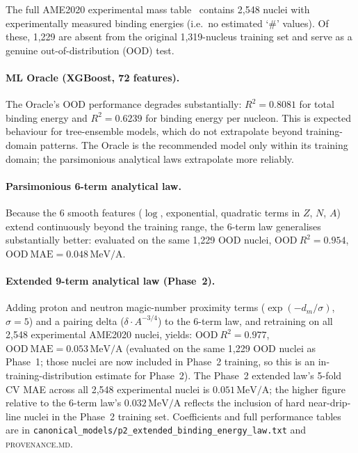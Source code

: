 \documentclass[9pt,twocolumn]{extarticle}
\begin{document}
The full AME2020 experimental mass table~\cite{Huang2021,Wang2021} contains 2,548 nuclei with experimentally measured binding energies (i.e.\ no estimated `\#' values).
Of these, 1,229 are absent from the original 1,319-nucleus training set and serve as a genuine out-of-distribution (OOD) test.

\paragraph{ML Oracle (XGBoost, 72 features).}
The Oracle's OOD performance degrades substantially: $R^2 = 0.8081$ for total binding energy and $R^2 = 0.6239$ for binding energy per nucleon.
This is expected behaviour for tree-ensemble models, which do not extrapolate beyond training-domain patterns.
The Oracle is the recommended model only within its training domain; the parsimonious analytical laws extrapolate more reliably.

\paragraph{Parsimonious 6-term analytical law.}
Because the 6 smooth features ($\log$, exponential, quadratic terms in $Z$, $N$, $A$) extend continuously beyond the training range, the 6-term law generalises substantially better: evaluated on the same 1,229 OOD nuclei, $\mathrm{OOD}\ R^2 = 0.954$, $\mathrm{OOD}\ \mathrm{MAE} = 0.048\,\mathrm{MeV/A}$.

\paragraph{Extended 9-term analytical law (Phase~2).}
Adding proton and neutron magic-number proximity terms ($\exp(-d_m/\sigma)$, $\sigma=5$) and a pairing delta ($\delta \cdot A^{-3/4}$) to the 6-term law, and retraining on all 2,548 experimental AME2020 nuclei, yields:
$\mathrm{OOD}\ R^2 = 0.977$, $\mathrm{OOD}\ \mathrm{MAE} = 0.053\,\mathrm{MeV/A}$ (evaluated on the same 1,229 OOD nuclei as Phase~1; those nuclei are now included in Phase~2 training, so this is an in-training-distribution estimate for Phase~2).
The Phase~2 extended law's 5-fold CV MAE across all 2,548 experimental nuclei is $0.051\,\mathrm{MeV/A}$; the higher figure relative to the 6-term law's $0.032\,\mathrm{MeV/A}$ reflects the inclusion of hard near-drip-line nuclei in the Phase~2 training set.
Coefficients and full performance tables are in \texttt{canonical\_models/p2\_extended\_binding\_energy\_law.txt} and \textsc{provenance.md}.
\end{document}
